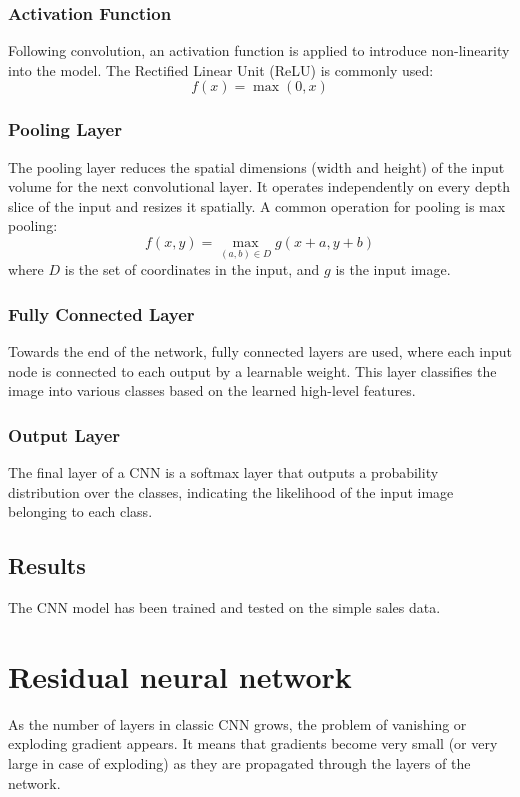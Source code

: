 \subsubsection{Activation Function}
Following convolution, an activation function is applied to introduce non-linearity into the model. The Rectified Linear Unit (ReLU) is commonly used:
\[f(x) = \max(0, x)\]

\subsubsection{Pooling Layer}
The pooling layer reduces the spatial dimensions (width and height) of the input volume for the next convolutional layer. It operates independently on every depth slice of the input and resizes it spatially. A common operation for pooling is max pooling:
\[f(x, y) = \max_{(a,b) \in D} g(x+a, y+b)\]
where \(D\) is the set of coordinates in the input, and \(g\) is the input image.

\subsubsection{Fully Connected Layer}
Towards the end of the network, fully connected layers are used, where each input node is connected to each output by a learnable weight. This layer classifies the image into various classes based on the learned high-level features.

\subsubsection{Output Layer}
The final layer of a CNN is a softmax layer that outputs a probability distribution over the classes, indicating the likelihood of the input image belonging to each class.


\subsection{Results}
The CNN model has been trained and tested on the simple sales data.






\section{Residual neural network}

As the number of layers in classic CNN grows, the problem of vanishing or exploding gradient appears.
It means that gradients become very small (or very large in case of exploding) as they are propagated
through the layers of the network.

